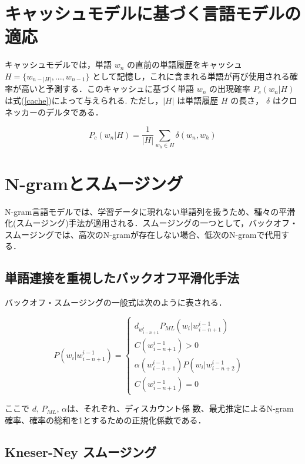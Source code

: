 \section{キャッシュモデルに基づく言語モデルの適応}
キャッシュモデルでは，単語 $w_n$ の直前の単語履歴をキャッシュ $H = \{ w_{n-|H|}, ..., w_{n-1}\} $ として記憶し，これに含まれる単語が再び使用される確率が高いと予測する．このキャッシュに基づく単語 $w_n$ の出現確率 $P_c(w_n|H)$ は式(\ref{cache})によって与えられる. ただし，$|H|$ は単語履歴 $H$ の長さ， $\delta$ はクロネッカーのデルタである．

\begin{equation}
		P_c(w_n|H) = \frac{1}{|H|} \sum_{w_h \in H} \delta (w_n, w_h)
    \label{cache}
\end{equation}

\section{N-gramとスムージング}

N-gram言語モデルでは、学習データに現れない単語列を扱うため、種々の平滑化(スムージング)手法が適用される．スムージングの一つとして，バックオフ・スムージングでは、高次のN-gramが存在しない場合、低次のN-gramで代用する．

\subsection{単語連接を重視したバックオフ平滑化手法}
バックオフ・スムージングの一般式は次のように表される．

\begin{equation}
		P(w_i|w_{i-n+1}^{i-1}) = 
    \begin{cases} 
        d_{w_{i-n+1}^i} P_{ML}(w_i|w_{i-n+1}^{i-1}) & \\ C(w_{i-n+1}^{i-1}) > 0\\ 
        \alpha(w_{i-n+1}^{i-1})P(w_i|w_{i-n+2}^{i-1}) & \\ C(w_{i-n+1}^{i-1}) = 0
    \end{cases} 
    \label{ngram_smoosing1}
\end{equation}

ここで $d$, $P_{ML}$, $\alpha$は、それぞれ、ディスカウント係
数、最尤推定によるN-gram確率、確率の総和を1とするための正規化係数である．

\subsection{Kneser-Ney スムージング}

